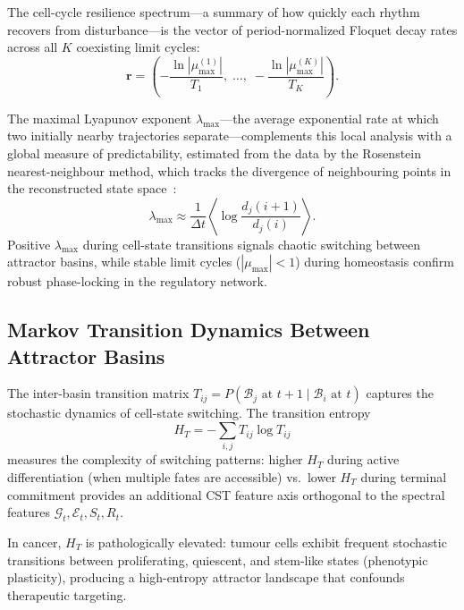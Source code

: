 \documentclass[preprint,12pt,amsmath,amssymb,superscriptaddress,floatfix]{revtex4-2}
\begin{document}
The cell-cycle resilience spectrum---a summary of how quickly each rhythm
recovers from disturbance---is the vector of period-normalized Floquet decay
rates across all $K$ coexisting limit cycles:
\begin{equation}
    \mathbf{r} = \left(-\frac{\ln|\mu_{\max}^{(1)}|}{T_1},\;
    \ldots,\;-\frac{\ln|\mu_{\max}^{(K)}|}{T_K}\right).
    \label{eq:resilience}
\end{equation}

The maximal Lyapunov exponent $\lambda_{\max}$---the average exponential
rate at which two initially nearby trajectories separate---complements this
local analysis with a global measure of predictability, estimated from the
data by the Rosenstein nearest-neighbour method, which tracks the divergence
of neighbouring points in the reconstructed state
space~\cite{ref_rosenstein1993}:
\begin{equation}
    \lambda_{\max} \approx \frac{1}{\Delta t}\left\langle
    \log\frac{d_j(i{+}1)}{d_j(i)}\right\rangle.
    \label{eq:lyapunov}
\end{equation}
Positive $\lambda_{\max}$ during cell-state transitions signals chaotic
switching between attractor basins, while stable limit cycles
($|\mu_{\max}| < 1$) during homeostasis confirm robust phase-locking
in the regulatory network.

\subsection{Markov Transition Dynamics Between Attractor Basins}
\label{subsec:cst_markov_theory}

The inter-basin transition matrix
$T_{ij} = P(\mathcal{B}_j \text{ at } t{+}1 \mid \mathcal{B}_i
\text{ at } t)$ captures the stochastic dynamics of cell-state
switching.  The transition entropy
\begin{equation}
    H_T = -\sum_{i,j} T_{ij}\log T_{ij}
    \label{eq:transition_entropy}
\end{equation}
measures the complexity of switching patterns: higher $H_T$ during
active differentiation (when multiple fates are accessible) vs.\ lower
$H_T$ during terminal commitment provides an additional CST feature
axis orthogonal to the spectral features
$\mathcal{G}_t, \mathcal{E}_t, S_t, R_t$.

In cancer, $H_T$ is pathologically elevated: tumour cells exhibit
frequent stochastic transitions between proliferating, quiescent, and
stem-like states (phenotypic plasticity), producing a high-entropy
attractor landscape that confounds therapeutic targeting.
\end{document}

